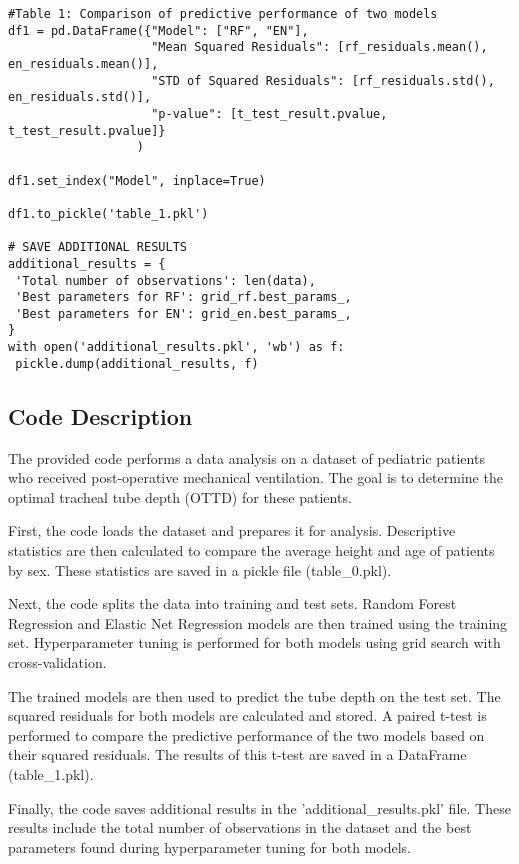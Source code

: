 \documentclass[11pt]{article}
\begin{document}
\begin{verbatim}
#Table 1: Comparison of predictive performance of two models
df1 = pd.DataFrame({"Model": ["RF", "EN"],
                    "Mean Squared Residuals": [rf_residuals.mean(), en_residuals.mean()],
                    "STD of Squared Residuals": [rf_residuals.std(), en_residuals.std()],
                    "p-value": [t_test_result.pvalue, t_test_result.pvalue]}
                  )

df1.set_index("Model", inplace=True)

df1.to_pickle('table_1.pkl')

# SAVE ADDITIONAL RESULTS
additional_results = {
 'Total number of observations': len(data), 
 'Best parameters for RF': grid_rf.best_params_,
 'Best parameters for EN': grid_en.best_params_,
}
with open('additional_results.pkl', 'wb') as f:
 pickle.dump(additional_results, f)

\end{verbatim}

\subsection{Code Description}

The provided code performs a data analysis on a dataset of pediatric patients who received post-operative mechanical ventilation. The goal is to determine the optimal tracheal tube depth (OTTD) for these patients. 

First, the code loads the dataset and prepares it for analysis. Descriptive statistics are then calculated to compare the average height and age of patients by sex. These statistics are saved in a pickle file (table\_0.pkl).

Next, the code splits the data into training and test sets. Random Forest Regression and Elastic Net Regression models are then trained using the training set. Hyperparameter tuning is performed for both models using grid search with cross-validation.

The trained models are then used to predict the tube depth on the test set. The squared residuals for both models are calculated and stored. A paired t-test is performed to compare the predictive performance of the two models based on their squared residuals. The results of this t-test are saved in a DataFrame (table\_1.pkl).

Finally, the code saves additional results in the 'additional\_results.pkl' file. These results include the total number of observations in the dataset and the best parameters found during hyperparameter tuning for both models.
\end{document}
